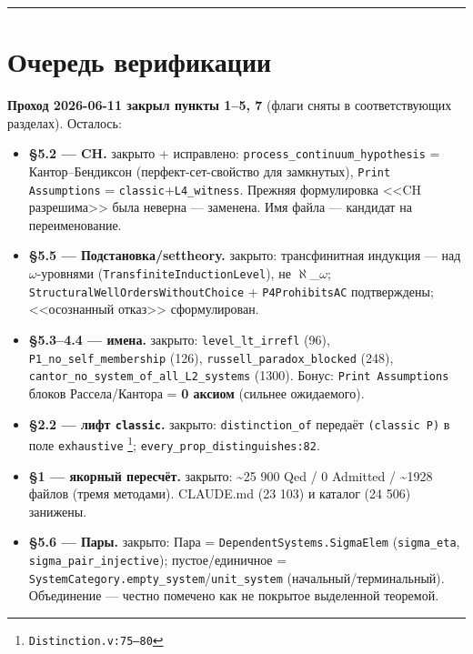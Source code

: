 \documentclass[11pt,a4paper]{article}
\begin{document}
\bigskip\hrule\bigskip

\section{Очередь верификации}

\textbf{Проход 2026-06-11 закрыл пункты 1--5, 7} (флаги сняты в соответствующих разделах). Осталось:

\begin{itemize}
\item \textbf{\S{}5.2 --- CH.} закрыто + исправлено: \texttt{process\_\allowbreak{}continuum\_\allowbreak{}hypothesis} = Кантор--Бендиксон (перфект-сет-свойство для замкнутых), \texttt{Print Assumptions} = \texttt{classic}+\texttt{L4\_\allowbreak{}witness}. Прежняя формулировка <<CH разрешима>> была неверна --- заменена. Имя файла --- кандидат на переименование.
\item \textbf{\S{}5.5 --- Подстановка/settheory.} закрыто: трансфинитная индукция --- над $\omega$-уровнями (\texttt{Transfinite\allowbreak{}Induction\allowbreak{}Level}), не $\aleph$\_$\omega$; \texttt{Structural\allowbreak{}Well\allowbreak{}Orders\allowbreak{}Without\allowbreak{}Choice} + \texttt{P4Prohibits\allowbreak{}AC} подтверждены; <<осознанный отказ>> сформулирован.
\item \textbf{\S{}5.3--4.4 --- имена.} закрыто: \texttt{level\_\allowbreak{}lt\_\allowbreak{}irrefl} (96), \texttt{P1\_\allowbreak{}no\_\allowbreak{}self\_\allowbreak{}membership} (126), \texttt{russell\_\allowbreak{}paradox\_\allowbreak{}blocked} (248), \texttt{cantor\_\allowbreak{}no\_\allowbreak{}system\_\allowbreak{}of\_\allowbreak{}all\_\allowbreak{}L2\_\allowbreak{}systems} (1300). Бонус: \texttt{Print Assumptions} блоков Рассела/Кантора = \textbf{0 аксиом} (сильнее ожидаемого).
\item \textbf{\S{}2.2 --- лифт \texttt{classic}.} закрыто: \texttt{distinction\_\allowbreak{}of} передаёт \texttt{(classic P)} в поле \texttt{exhaustive} \footnote{\texttt{Distinction.v:75--80}}; \texttt{every\_\allowbreak{}prop\_\allowbreak{}distinguishes:82}.
\item \textbf{\S{}1 --- якорный пересчёт.} закрыто: \textasciitilde{}25 900 Qed / 0 Admitted / \textasciitilde{}1928 файлов (тремя методами). CLAUDE.md (23 103) и каталог (24 506) занижены.
\item \textbf{\S{}5.6 --- Пары.} закрыто: Пара = \texttt{Dependent\allowbreak{}Systems.Sigma\allowbreak{}Elem} (\texttt{sigma\_\allowbreak{}eta}, \texttt{sigma\_\allowbreak{}pair\_\allowbreak{}injective}); пустое/единичное = \texttt{System\allowbreak{}Category.empty\_\allowbreak{}system}/\texttt{unit\_\allowbreak{}system} (начальный/терминальный). Объединение --- честно помечено как не покрытое выделенной теоремой.

\end{itemize}
\end{document}
